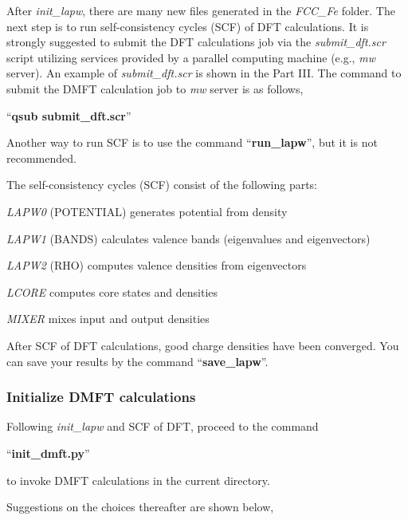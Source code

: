 \documentclass[12 pt]{article}
\begin{document}
  After \emph{init\_lapw}, there are many new files generated in the \emph{FCC\_Fe} folder. The next step is 
to run self-consistency cycles (SCF) of DFT calculations. It is strongly suggested to submit the DFT calculations 
job via the \emph{submit\_dft.scr} script utilizing services provided by a parallel computing machine 
(e.g., \emph{mw} server). An example of \emph{submit\_dft.scr} is shown in the Part III. The command to submit the 
DMFT calculation job to \emph{mw} server is as follows,

  ``\textbf{qsub submit\_dft.scr}''
 
  Another way to run SCF is to use the command ``\textbf{run\_lapw}'', but it is not recommended.

  The self-consistency cycles (SCF) consist of the following parts:

  \emph{LAPW0} (POTENTIAL) generates potential from density

  \emph{LAPW1} (BANDS) calculates valence bands (eigenvalues and eigenvectors)

  \emph{LAPW2} (RHO) computes valence densities from eigenvectors

  \emph{LCORE} computes core states and densities

  \emph{MIXER} mixes input and output densities

  After SCF of DFT calculations, good charge densities have been converged. You can save your results by the 
command ``\textbf{save\_lapw}''.   

  \cleardoublepage

	\subsubsection{Initialize DMFT calculations}

  Following \emph{init\_lapw} and SCF of DFT, proceed to the command 

  ``\textbf{init\_dmft.py}''

  to invoke DMFT calculations in the current directory. 

  Suggestions on the choices thereafter are shown below, 
\end{document}
